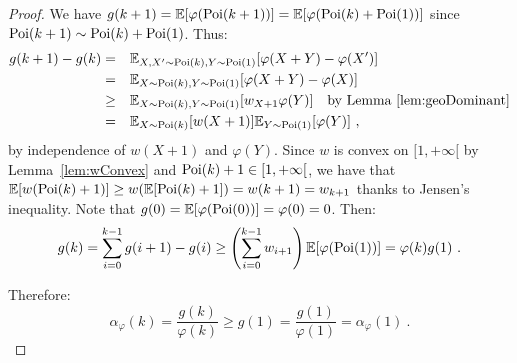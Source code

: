 \begin{proof}
  We have $g(k+1) = \mathbb{E}[\varphi(\operatorname{\text{Poi}}(k+1))] = \mathbb{E}[\varphi(\operatorname{\text{Poi}}(k)+\operatorname{\text{Poi}}(1))]$ since $\operatorname{\text{Poi}}(k+1) \sim \operatorname{\text{Poi}}(k)+\operatorname{\text{Poi}}(1)$. Thus:
  \begin{equation}
    \begin{aligned}
      g(k+1)-g(k) &=&& \mathbb{E}_{X,X' \sim \operatorname{\text{Poi}}(k), Y \sim \operatorname{\text{Poi}}(1)}[\varphi(X+Y) - \varphi(X')]\\
      &=&& \mathbb{E}_{X \sim \operatorname{\text{Poi}}(k), Y \sim \operatorname{\text{Poi}}(1)}[\varphi(X+Y) - \varphi(X)]\\
      &\geq&& \mathbb{E}_{X \sim \operatorname{\text{Poi}}(k), Y \sim \operatorname{\text{Poi}}(1)}[w_{X+1}\varphi(Y)] \quad \text{by Lemma~\ref{lem:geoDominant}}\\
      &=&& \mathbb{E}_{X \sim \operatorname{\text{Poi}}(k)}[w(X+1)]\mathbb{E}_{Y \sim \operatorname{\text{Poi}}(1)}[\varphi(Y)] \ ,
    \end{aligned}
  \end{equation}
  by independence of $w(X+1)$ and $\varphi(Y)$. Since $w$ is convex on $[1,+\infty[$ by Lemma~\ref{lem:wConvex} and $\operatorname{\text{Poi}}(k)+1 \in [1,+\infty[$, we have that $\mathbb{E}[w(\operatorname{\text{Poi}}(k)+1)] \geq w(\mathbb{E}[\operatorname{\text{Poi}}(k)+1]) = w(k+1) = w_{k+1}$ thanks to Jensen's inequality. Note that $g(0) = \mathbb{E}[\varphi(\operatorname{\text{Poi}}(0))] = \varphi(0) = 0$. Then:
  \[g(k) = \sum_{i=0}^{k-1} g(i+1)-g(i) \geq  \left(\sum_{i=0}^{k-1}w_{i+1}\right)\mathbb{E}[\varphi(\operatorname{\text{Poi}}(1))] = \varphi(k)g(1) \ .\]

  Therefore:
  \[\alpha_{\varphi}(k) = \frac{g(k)}{\varphi(k)} \geq g(1) = \frac{g(1)}{\varphi(1)}=\alpha_{\varphi}(1) \ .\]
\end{proof}



